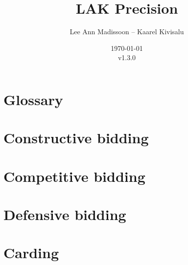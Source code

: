 \documentclass[11pt]{report}
\title{LAK Precision}
\author{Lee Ann Madissoon -- Kaarel Kivisalu}
\date{\today\\v1.3.0}
\begin{document}
\maketitle
\tableofcontents


\chapter*{Glossary}


\chapter{Constructive bidding}



% 
% 












\chapter{Competitive bidding}


\chapter{Defensive bidding}


\chapter{Carding}

\end{document}
